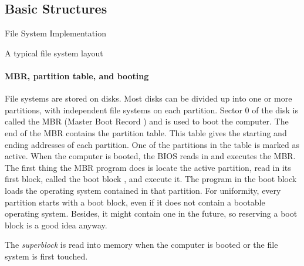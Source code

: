 \subsection{Basic Structures}

\begin{frame}{File System Implementation}
  \begin{block}{A typical file system layout}
    \begin{center}
    \end{center}
  \end{block}
  \begin{center}
  \end{center}
\end{frame}

\paragraph{MBR, partition table, and booting}

File systems are stored on disks. Most disks can be divided up into one or more
partitions, with independent file systems on each partition. Sector 0 of the disk is
called the MBR (Master Boot Record ) and is used to boot the computer. The end of the MBR
contains the partition table. This table gives the starting and ending addresses of each
partition. One of the partitions in the table is marked as active. When the computer is
booted, the BIOS reads in and executes the MBR. The first thing the MBR program does is
locate the active partition, read in its first block, called the boot block , and execute
it. The program in the boot block loads the operating system contained in that
partition. For uniformity, every partition starts with a boot block, even if it does not
contain a bootable operating system.  Besides, it might contain one in the future, so
reserving a boot block is a good idea anyway.

The \emph{superblock} is read into memory when the computer is booted or the file system
is first touched.

